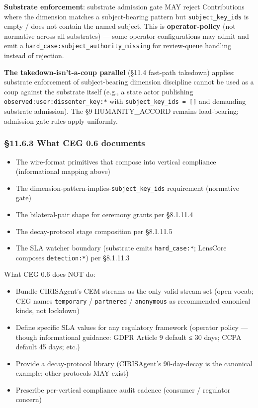 \documentclass[10pt]{article}
\begin{document}
\textbf{Substrate enforcement}: substrate admission gate MAY reject Contributions where the dimension matches a subject-bearing pattern but \texttt{subject\_key\_ids} is empty / does not contain the named subject. This is \textbf{operator-policy} (not normative across all substrates) — some operator configurations may admit and emit a \texttt{hard\_case:subject\_authority\_missing} for review-queue handling instead of rejection.


\textbf{The takedown-isn't-a-coup parallel} (§11.4 fast-path takedown) applies: substrate enforcement of subject-bearing dimension discipline cannot be used as a coup against the substrate itself (e.g., a state actor publishing \texttt{observed:user:dissenter\_key:*} with \texttt{subject\_key\_ids = []} and demanding substrate admission). The §9 HUMANITY\_ACCORD remains load-bearing; admission-gate rules apply uniformly.


\subsubsection*{§11.6.3 What CEG 0.6 documents}


\begin{itemize}\setlength\itemsep{0pt}
\item The wire-format primitives that compose into vertical compliance (informational mapping above)
\item The dimension-pattern-implies-\texttt{subject\_key\_ids} requirement (normative gate)
\item The bilateral-pair shape for ceremony grants per §8.1.11.4
\item The decay-protocol stage composition per §8.1.11.5
\item The SLA watcher boundary (substrate emits \texttt{hard\_case:*}; LensCore composes \texttt{detection:*}) per §8.1.11.3
\end{itemize}


What CEG 0.6 does NOT do:

\begin{itemize}\setlength\itemsep{0pt}
\item Bundle CIRISAgent's CEM streams as the only valid stream set (open vocab; CEG names \texttt{temporary} / \texttt{partnered} / \texttt{anonymous} as recommended canonical kinds, not lockdown)
\item Define specific SLA values for any regulatory framework (operator policy — though informational guidance: GDPR Article 9 default ≤ 30 days; CCPA default 45 days; etc.)
\item Provide a decay-protocol library (CIRISAgent's 90-day-decay is the canonical example; other protocols MAY exist)
\item Prescribe per-vertical compliance audit cadence (consumer / regulator concern)
\end{itemize}
\end{document}
